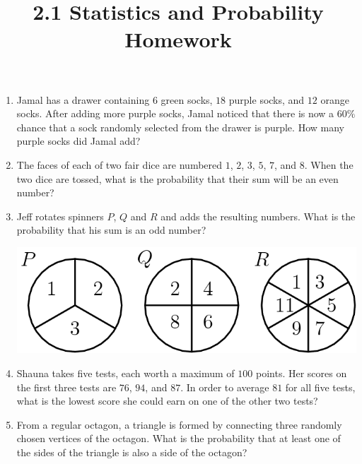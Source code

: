 \documentclass{article}
\title{2.1 Statistics and Probability Homework}
\author{}
\date{}
\begin{document}
\maketitle

\begin{enumerate}[resume]
    \item Jamal has a drawer containing $6$ green socks, $18$ purple socks, and $12$ orange socks.
        After adding more purple socks, Jamal noticed that there is now a $60\%$ chance that a sock randomly selected from the drawer is purple.
        How many purple socks did Jamal add?
        \vspace{3cm}
    \item The faces of each of two fair dice are numbered $1$, $2$, $3$, $5$, $7$, and $8$.
        When the two dice are tossed, what is the probability that their sum will be an even number?
        \vspace{3cm}
    \item Jeff rotates spinners $P$, $Q$ and $R$ and adds the resulting numbers.
        What is the probability that his sum is an odd number?
        \begin{center}
            \includegraphics[scale=0.25]{spinners.png}
        \end{center}
        \vspace{2cm}
    \item Shauna takes five tests, each worth a maximum of $100$ points.
        Her scores on the first three tests are $76$, $94$, and $87$.
        In order to average $81$ for all five tests, what is the lowest score she could earn on one of the other two tests?
        \vspace{3cm}
    \item From a regular octagon, a triangle is formed by connecting three randomly chosen vertices of the octagon.
        What is the probability that at least one of the sides of the triangle is also a side of the octagon?
        \begin{center}

\end{center}
\end{enumerate}
\end{document}
